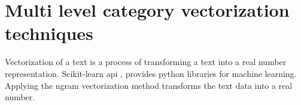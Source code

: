 
\chapter{Multi level category vectorization techniques}

Vectorization of a text is a process of transforming a text into a real number representation. Scikit-learn api \parencite{sklearn_api}, provides python libraries for machine learning. Applying the ngram vectorization method transforms the text data into a real number. 